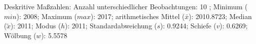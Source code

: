 				\label{tableValues:afec021f}
				\vspace*{-\baselineskip}
                    \begin{noten}
                	    \note{} Deskritive Maßzahlen:
                	    Anzahl unterschiedlicher Beobachtungen: 10%
                	    ; 
                	      Minimum ($min$): 2008; 
                	      Maximum ($max$): 2017; 
                	      arithmetisches Mittel ($\bar{x}$): \num[round-mode=places,round-precision=2]{2010,8723}; 
                	      Median ($\tilde{x}$): 2011; 
                	      Modus ($h$): 2011; 
                	      Standardabweichung ($s$): \num[round-mode=places,round-precision=2]{0,9244}; 
                	      Schiefe ($v$): \num[round-mode=places,round-precision=2]{0,6269}; 
                	      Wölbung ($w$): \num[round-mode=places,round-precision=2]{5,5578}
                     \end{noten}


